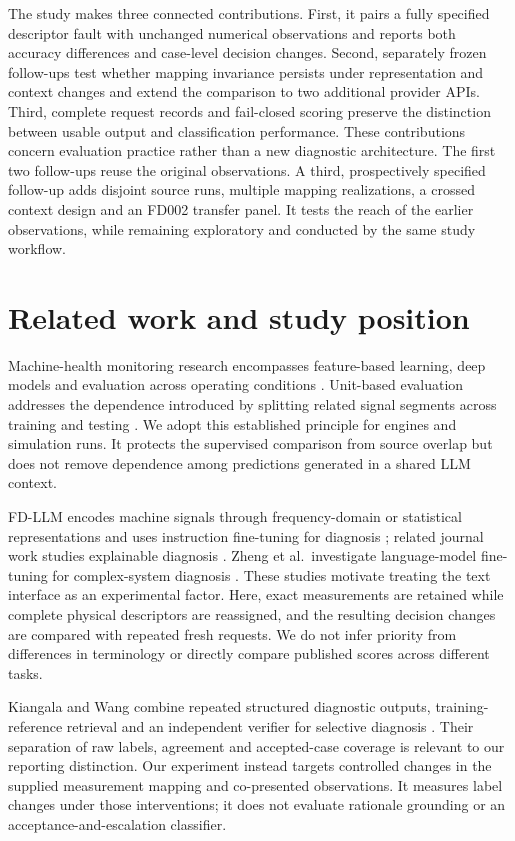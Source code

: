 \documentclass[11pt,a4paper]{article}
\begin{document}
The study makes three connected contributions. First, it pairs a fully specified descriptor fault with unchanged numerical observations and reports both accuracy differences and case-level decision changes. Second, separately frozen follow-ups test whether mapping invariance persists under representation and context changes and extend the comparison to two additional provider APIs. Third, complete request records and fail-closed scoring preserve the distinction between usable output and classification performance. These contributions concern evaluation practice rather than a new diagnostic architecture. The first two follow-ups reuse the original observations. A third, prospectively specified follow-up adds disjoint source runs, multiple mapping realizations, a crossed context design and an FD002 transfer panel. It tests the reach of the earlier observations, while remaining exploratory and conducted by the same study workflow.

\section{Related work and study position}
Machine-health monitoring research encompasses feature-based learning, deep models and evaluation across operating conditions \citep{lei2020applications,zhao2019deep}. Unit-based evaluation addresses the dependence introduced by splitting related signal segments across training and testing \citep{vieira2026realistic}. We adopt this established principle for engines and simulation runs. It protects the supervised comparison from source overlap but does not remove dependence among predictions generated in a shared LLM context.

FD-LLM encodes machine signals through frequency-domain or statistical representations and uses instruction fine-tuning for diagnosis \citep{qaid2024fdllm}; related journal work studies explainable diagnosis \citep{qaid2026explainable}. Zheng et al.\ investigate language-model fine-tuning for complex-system diagnosis \citep{zheng2024empirical}. These studies motivate treating the text interface as an experimental factor. Here, exact measurements are retained while complete physical descriptors are reassigned, and the resulting decision changes are compared with repeated fresh requests. We do not infer priority from differences in terminology or directly compare published scores across different tasks.

Kiangala and Wang combine repeated structured diagnostic outputs, training-reference retrieval and an independent verifier for selective diagnosis \citep{kiangala2026verification}. Their separation of raw labels, agreement and accepted-case coverage is relevant to our reporting distinction. Our experiment instead targets controlled changes in the supplied measurement mapping and co-presented observations. It measures label changes under those interventions; it does not evaluate rationale grounding or an acceptance-and-escalation classifier.
\end{document}
